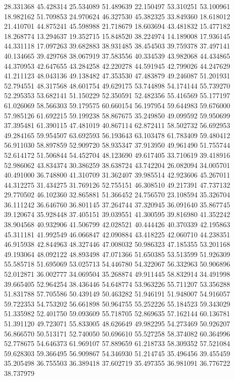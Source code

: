 28.331368
45.428314
25.534089
51.489639
22.150497
53.310251
53.100961
18.982162
51.709853
24.970624
46.327530
45.382325
33.849360
18.618012
21.410701
44.875241
45.598988
21.718679
18.603694
43.481832
15.477182
18.268774
13.294637
19.352715
15.848520
38.224974
14.189008
17.936145
44.331118
17.097263
39.682883
38.931485
38.454503
39.759378
37.497141
40.134665
39.429768
38.067919
37.583556
40.334539
43.982068
44.434865
44.370953
42.647655
43.284258
42.220278
44.591945
42.799026
44.247629
41.211123
48.043136
49.138482
47.353530
47.483879
49.246087
51.201931
52.794551
48.317568
48.601754
49.629175
53.744898
54.174144
55.739270
52.295353
53.682141
51.150229
52.350591
52.482356
55.416569
55.177197
61.026069
58.566303
59.179575
60.660154
56.197954
59.644983
59.676000
57.985126
61.692215
59.199238
58.867675
35.249850
49.099592
59.950699
37.395481
61.390115
47.481019
40.867114
62.872411
58.502732
56.692953
49.284165
59.954507
63.692593
56.193643
63.103478
61.783409
59.480412
56.911030
58.897859
52.909720
58.935347
37.913950
49.961490
51.755744
52.614172
51.506844
54.452704
48.123690
49.617405
33.710619
39.418916
52.986062
43.834374
30.386259
38.638724
43.742204
26.082094
34.005701
40.491000
36.748800
41.310709
31.362407
39.985514
42.923606
45.267011
44.312275
31.434275
31.769126
52.755151
46.308510
49.217391
47.737132
29.770502
46.102360
32.865881
51.366452
24.756570
23.108594
35.326704
36.111242
36.646760
36.801145
37.264744
37.320945
36.091640
35.867745
39.120674
35.928448
37.405151
39.039551
41.300595
39.816980
41.352242
38.904568
40.932906
41.506799
42.028521
40.444426
40.370339
42.195863
45.311181
41.992549
46.066847
42.090884
43.418225
42.060710
44.238351
46.915938
42.844963
48.327446
47.008032
50.986323
47.185355
53.201168
49.193064
48.092122
48.893498
47.071366
51.650385
53.513599
51.926309
55.585718
51.695069
53.025713
54.446780
54.322067
56.332963
50.906896
52.012871
36.002777
34.069504
35.268874
49.911445
58.832914
34.491998
39.665405
52.964254
38.436446
54.648774
53.963226
55.711207
53.356288
51.831788
57.705586
50.439149
50.463282
51.946191
51.948007
54.916057
59.722353
54.753202
56.661898
50.964755
55.252226
55.184523
59.343029
51.335982
52.401750
59.093609
55.718705
52.869635
57.162144
60.136781
51.391120
49.723071
55.833005
48.626649
49.982295
54.273469
50.926207
56.866570
50.513171
52.740050
50.696610
55.527258
58.374082
60.364996
52.778675
54.646373
61.969107
57.889659
61.218733
58.309352
57.521084
59.628303
59.366495
56.909867
54.346930
51.214745
35.496456
39.455459
35.205498
36.755503
36.389418
37.602719
35.497355
36.981091
36.776722
38.737979
